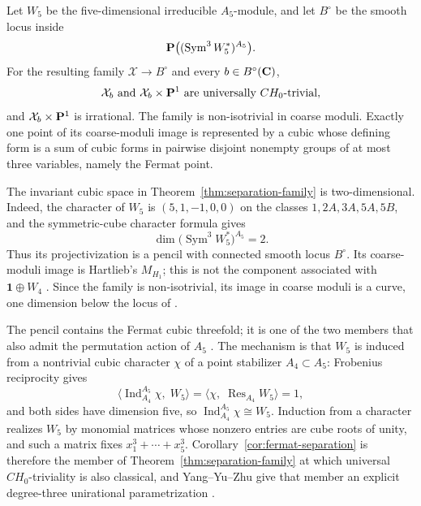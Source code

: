 \begin{theorem}
\label{thm:separation-family}
%
%
Let \(W_5\) be the five-dimensional irreducible \(A_5\)-module, and let
\(B^\circ\) be the smooth locus inside
\[
 \mathbf P\bigl((\operatorname{Sym}^3W_5^*)^{A_5}\bigr).
\]
For the resulting family \(\mathcal X\to B^\circ\) and every
\(b\in B^\circ(\mathbf C)\),
\[
 \mathcal X_b\text{ and }\mathcal X_b\times\mathbf P^1
 \text{ are universally }CH_0\text{-trivial},
\]
and \(\mathcal X_b\times\mathbf P^1\) is irrational.  The family is
non-isotrivial in coarse moduli.  Exactly one point of its coarse-moduli
image is represented by a cubic whose defining form is a sum of cubic forms
in pairwise disjoint nonempty groups of at most three variables, namely the
Fermat point.
\end{theorem}

The invariant cubic space in Theorem~\ref{thm:separation-family} is
two-dimensional.  Indeed, the character of \(W_5\) is
\((5,1,-1,0,0)\) on the classes \(1,2A,3A,5A,5B\), and the symmetric-cube
character formula gives
\[
 \dim \bigl(\operatorname{Sym}^3W_5^*\bigr)^{A_5}=2.
\]
Thus its projectivization is a pencil with connected smooth locus
\(B^\circ\).  Its coarse-moduli image is Hartlieb's \(M_{H_1}\); this is
not the component associated with \(\mathbf1\oplus W_4\)
\cite[Lemma~5.5]{Hartlieb}.  Since the family is non-isotrivial, its image
in coarse moduli is a curve, one dimension below the locus of \cite{YYZ}.

\begin{remark}
\label{rem:fermat-in-pencil}
The pencil contains the Fermat cubic threefold; it is one of the two members
that also admit the permutation action of \(A_5\)
\cite[Lemma~5.5]{Hartlieb}.  The mechanism is that \(W_5\) is induced from
a nontrivial cubic character \(\chi\) of a point stabilizer
\(A_4\subset A_5\): Frobenius reciprocity gives
\[
 \bigl\langle\operatorname{Ind}_{A_4}^{A_5}\chi,\;W_5\bigr\rangle
 =\bigl\langle\chi,\;\operatorname{Res}_{A_4}W_5\bigr\rangle=1,
\]
and both sides have dimension five, so
\(\operatorname{Ind}_{A_4}^{A_5}\chi\cong W_5\).  Induction from a
character realizes \(W_5\) by monomial matrices whose nonzero entries are
cube roots of unity, and such a matrix fixes
\(x_1^3+\cdots+x_5^3\).  Corollary~\ref{cor:fermat-separation} is therefore
the member of Theorem~\ref{thm:separation-family} at which universal
\(CH_0\)-triviality is also classical, and Yang--Yu--Zhu give that member
an explicit degree-three unirational parametrization
\cite[Remark~3.6]{YYZ}.
\end{remark}

